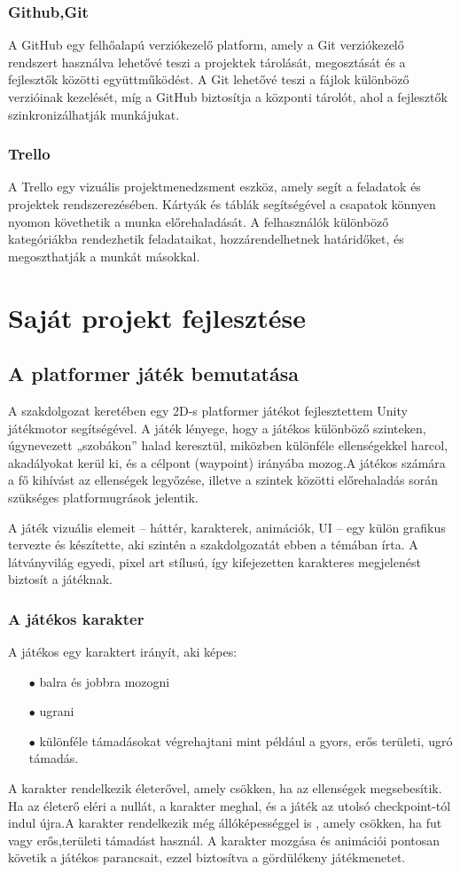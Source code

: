 \documentclass[
]{thesis-ekf}
\theoremstyle{definition}
\theoremstyle{remark}
\begin{document}
\subsection{Github,Git}
A GitHub egy felhőalapú verziókezelő platform, amely a Git verziókezelő rendszert használva lehetővé teszi a projektek tárolását, megosztását és a fejlesztők közötti együttműködést. A Git lehetővé teszi a fájlok különböző verzióinak kezelését, míg a GitHub biztosítja a központi tárolót, ahol a fejlesztők szinkronizálhatják munkájukat.\cite{GithubAndGit}
\subsection{Trello}
A Trello egy vizuális projektmenedzsment eszköz, amely segít a feladatok és projektek rendszerezésében. Kártyák és táblák segítségével a csapatok könnyen nyomon követhetik a munka előrehaladását. A felhasználók különböző kategóriákba rendezhetik feladataikat, hozzárendelhetnek határidőket, és megoszthatják a munkát másokkal.\cite{Trello}


\chapter{Saját projekt fejlesztése}
\section{A platformer játék bemutatása}
A szakdolgozat keretében egy 2D-s platformer játékot fejlesztettem Unity játékmotor segítségével. A játék lényege, hogy a játékos különböző szinteken, úgynevezett „szobákon” halad keresztül, miközben különféle ellenségekkel harcol, akadályokat kerül ki, és a célpont (waypoint) irányába mozog.A játékos számára a fő kihívást az ellenségek legyőzése, illetve a szintek közötti előrehaladás során szükséges platformugrások jelentik.

A játék vizuális elemeit – háttér, karakterek, animációk, UI – egy külön grafikus tervezte és készítette, aki szintén a szakdolgozatát ebben a témában írta. A látványvilág egyedi, pixel art stílusú, így kifejezetten karakteres megjelenést biztosít a játéknak.
\subsection{A játékos karakter}
A játékos egy karaktert irányít, aki képes:
\begin{itemize}
	\item[$\bullet$] balra és jobbra mozogni
	\item[$\bullet$] ugrani
	\item[$\bullet$] különféle támadásokat végrehajtani mint például a gyors, erős területi, ugró támadás.
\end{itemize}
A karakter rendelkezik életerővel, amely csökken, ha az ellenségek megsebesítik. Ha az életerő eléri a nullát, a karakter meghal, és a játék az utolsó checkpoint-tól indul újra.A karakter rendelkezik még állóképességgel is , amely csökken, ha fut vagy erős,területi támadást használ.
A karakter mozgása és animációi pontosan követik a játékos parancsait, ezzel biztosítva a gördülékeny játékmenetet.
\end{document}
